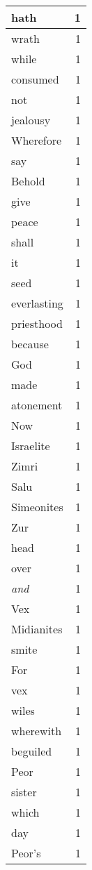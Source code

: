 \begin{center}
\begin{longtable}{l|r}
hath & 1\\ \hline 
wrath & 1\\ \hline 
while & 1\\ \hline 
consumed & 1\\ \hline 
not & 1\\ \hline 
jealousy & 1\\ \hline 
Wherefore & 1\\ \hline 
say & 1\\ \hline 
Behold & 1\\ \hline 
give & 1\\ \hline 
peace & 1\\ \hline 
shall & 1\\ \hline 
it & 1\\ \hline 
seed & 1\\ \hline 
everlasting & 1\\ \hline 
priesthood & 1\\ \hline 
because & 1\\ \hline 
God & 1\\ \hline 
made & 1\\ \hline 
atonement & 1\\ \hline 
Now & 1\\ \hline 
Israelite & 1\\ \hline 
Zimri & 1\\ \hline 
Salu & 1\\ \hline 
Simeonites & 1\\ \hline 
Zur & 1\\ \hline 
head & 1\\ \hline 
over & 1\\ \hline 
\emph{and} & 1\\ \hline 
Vex & 1\\ \hline 
Midianites & 1\\ \hline 
smite & 1\\ \hline 
For & 1\\ \hline 
vex & 1\\ \hline 
wiles & 1\\ \hline 
wherewith & 1\\ \hline 
beguiled & 1\\ \hline 
Peor & 1\\ \hline 
sister & 1\\ \hline 
which & 1\\ \hline 
day & 1\\ \hline 
Peor's & 1\\ \hline 
\end{longtable}
\end{center}



